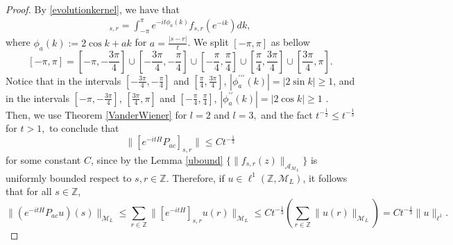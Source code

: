 \documentclass[12pt,oneside,onecolumn,open]{article}
\begin{document}
\begin{proof}
    By  \eqref{evolutionkernel}, we have that
    \begin{align}
         [e^{-itH}P_{ac}]_{s,r}=\int_{-\pi}^{\pi} e^{-it\phi _a (k )} f_{s,r}(e^{-ik}) dk, 
    \end{align} 
  where  
    $\phi _a (k ):=2\cos k +ak $ for $a= \frac{|s-r|}{t} $. We  split  $[-\pi, \pi]$ as bellow 
    $$[-\pi ,\pi ]=\left[-\pi, -\dfrac{3\pi}{4}\right]\cup \left[-\frac{3\pi }{4}, -\frac{\pi}{4}\right]\cup \left[-\frac{\pi}{4},\frac{\pi}{4}\right]\cup \left[\frac{\pi }{4}, \dfrac{3\pi}{4}\right]\cup \left[\frac{3\pi }{4}, \pi \right].$$ 
    Notice that in the intervals  $\left[-\frac{3\pi }{4}, -\frac{\pi}{4}\right]$ and $\left[\frac{\pi }{4},\frac{3\pi}{4}\right]$, $|\phi _{a} ^{\prime \prime \prime }(k )|=|2\sin k |\geq 1$, and in the intervals $[-\pi, -\frac{3\pi }{4}]$, $\left[\frac{3\pi }{4}, \pi \right]$ and $\left[-\frac{\pi }{4}, \frac{\pi}{4}\right]$, $|\phi _{a} ^{\prime \prime }(k )|=|2\cos k |\geq 1$ . Then, we use Theorem \ref{VanderWiener}  for $l=2$ and $l=3,$ and  the fact $t^{-\frac{1}{2}}\leq t^{-\frac{1}{3}}$ for $t>1,$  to conclude that
    \begin{equation}
        \|[e^{-itH}P_{ac}]_{s,r}\| \leq C  t^{-\frac{1}{3}}
    \end{equation}
    for some constant \( C \),  since by the Lemma \ref{ubound} \( \{\|f_{s,r}(z)\|_{\mathcal{A}_{\mathcal{M}_{L}}}\} \)  is uniformly bounded respect to \( s, r \in \mathbb{Z} .\)
    Therefore, if \( u \in \ell^{1}(\mathbb{Z}, \mathcal{M}_{L}) \), it follows that for all \( s \in \mathbb{Z} \),
    $$ \|(e^{-itH}P_{ac} u)(s)\|_{\mathcal{M}_{L}} \leq \sum_{r \in \mathbb{Z}} \|[e^{-itH}]_{s,r} u(r)\|_{\mathcal{M}_{L}} \leq C t^{-\frac{1}{3}} \left( \sum_{r \in \mathbb{Z}} \|u(r)\|_{\mathcal{M}_L} \right) = C t^{-\frac{1}{3}} \|u\|_{\ell ^{1}}. $$
\end{proof}
\end{document}
